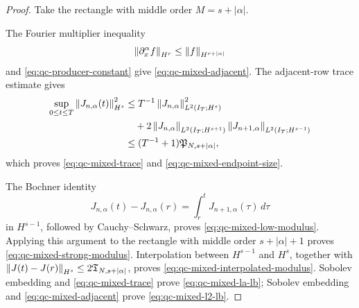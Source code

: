 \begin{proof}
Take the rectangle with middle order \(M=s+|\alpha|\).
\begin{samepage}
The Fourier
multiplier inequality
\[
 \left\lVert \partial_x^\alpha f\right\rVert_{H^r}
 \le \left\lVert f\right\rVert_{H^{r+|\alpha|}}
\]
and \eqref{eq:qc-producer-constant} give
\eqref{eq:qc-mixed-adjacent}.
The adjacent-row trace estimate gives
\begin{align*}
 \sup_{0\le t\le T}\left\lVert J_{n,\alpha}(t)\right\rVert_{H^s}^2
 &\le T^{-1}\left\lVert J_{n,\alpha}\right\rVert_{L^2(I_T;H^s)}^2\\
 &\quad+2\left\lVert J_{n,\alpha}\right\rVert_{L^2(I_T;H^{s+1})}
          \left\lVert J_{n+1,\alpha}\right\rVert_{L^2(I_T;H^{s-1})}\\
 &\le (T^{-1}+1)\mathfrak P_{N,s+|\alpha|},
\end{align*}
which proves \eqref{eq:qc-mixed-trace} and
\eqref{eq:qc-mixed-endpoint-size}.
\par
\end{samepage}
The Bochner identity
\[
 J_{n,\alpha}(t)-J_{n,\alpha}(r)
 =\int_r^tJ_{n+1,\alpha}(\tau)\,d\tau
\]
in \(H^{s-1}\), followed by Cauchy--Schwarz, proves
\eqref{eq:qc-mixed-low-modulus}.  Applying this argument to the rectangle
with middle order \(s+|\alpha|+1\) proves
\eqref{eq:qc-mixed-strong-modulus}.  Interpolation between
\(H^{s-1}\) and \(H^s\), together with
\(\left\lVert J(t)-J(r)\right\rVert_{H^s}\le2\mathfrak T_{N,s+|\alpha|}\), proves
\eqref{eq:qc-mixed-interpolated-modulus}.  Sobolev embedding and
\eqref{eq:qc-mixed-trace} prove \eqref{eq:qc-mixed-la-lb}; Sobolev embedding
and \eqref{eq:qc-mixed-adjacent} prove \eqref{eq:qc-mixed-l2-lb}.
\end{proof}

